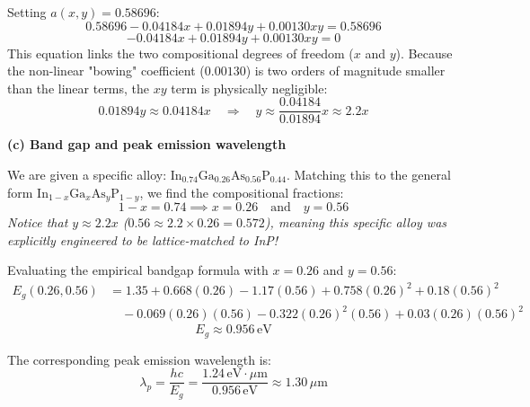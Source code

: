 Setting $a(x,y) = 0.58696$:
\begin{equation*}
  0.58696 - 0.04184 x + 0.01894 y + 0.00130 x y = 0.58696
\end{equation*}
\begin{equation*}
  -0.04184 x + 0.01894 y + 0.00130 x y = 0
\end{equation*}
This equation links the two compositional degrees of freedom ($x$ and $y$). Because the non-linear "bowing" coefficient ($0.00130$) is two orders of magnitude smaller than the linear terms, the $xy$ term is physically negligible:
\begin{equation*}
  0.01894 y \approx 0.04184 x \quad\Longrightarrow\quad y \approx \frac{0.04184}{0.01894} x \approx \boxed{2.2 x}
\end{equation*}

\textbf{(c) Band gap and peak emission wavelength}

We are given a specific alloy: $\text{In}_{0.74}\text{Ga}_{0.26}\text{As}_{0.56}\text{P}_{0.44}$.
Matching this to the general form $\text{In}_{1-x}\text{Ga}_x\text{As}_y\text{P}_{1-y}$, we find the compositional fractions:
\begin{equation*}
  1-x = 0.74 \implies x = 0.26 \quad \text{and} \quad y = 0.56
\end{equation*}
\textit{Notice that $y \approx 2.2x$ ($0.56 \approx 2.2 \times 0.26 = 0.572$), meaning this specific alloy was explicitly engineered to be lattice-matched to InP!}

Evaluating the empirical bandgap formula with $x=0.26$ and $y=0.56$:
\begin{align*}
  E_g(0.26, 0.56) &= 1.35 + 0.668(0.26) - 1.17(0.56) + 0.758(0.26)^2 + 0.18(0.56)^2 \\
  &\quad - 0.069(0.26)(0.56) - 0.322(0.26)^2(0.56) + 0.03(0.26)(0.56)^2
\end{align*}
\begin{equation*}
  E_g \approx \boxed{0.956\,\text{eV}}
\end{equation*}

The corresponding peak emission wavelength is:
\begin{equation*}
  \lambda_p = \frac{hc}{E_g} = \frac{1.24\,\text{eV}\cdot\mu\text{m}}{0.956\,\text{eV}} \approx \boxed{1.30\,\mu\text{m}}
\end{equation*}


